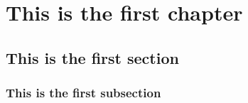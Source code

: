 \chapter{This is the first chapter}
\lipsum
\section{This is the first section}
\lipsum
\subsection{This is the first subsection}
\lipsum 
